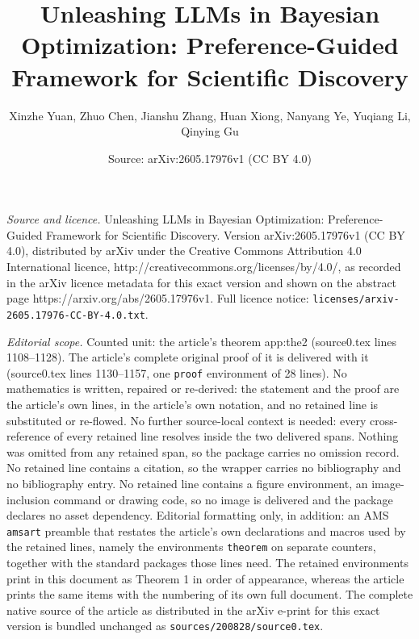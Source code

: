 \documentclass[10pt,a4paper]{amsart}
\title{Unleashing LLMs in Bayesian Optimization: Preference-Guided Framework for Scientific Discovery}
\author{Xinzhe Yuan, Zhuo Chen, Jianshu Zhang, Huan Xiong, Nanyang Ye, Yuqiang Li, Qinying Gu}
\date{Source: arXiv:2605.17976v1 (CC BY 4.0)}
\begin{document}
\maketitle

\noindent\emph{Source and licence.} Unleashing LLMs in Bayesian Optimization: Preference-Guided Framework for Scientific Discovery. Version arXiv:2605.17976v1 (CC BY 4.0), distributed by arXiv under the Creative Commons Attribution 4.0 International licence, http://creativecommons.org/licenses/by/4.0/, as recorded in the arXiv licence metadata for this exact version and shown on the abstract page https://arxiv.org/abs/2605.17976v1. Full licence notice: \texttt{licenses/arxiv-2605.17976-CC-BY-4.0.txt}.\par\smallskip

\noindent\textit{Editorial scope.} Counted unit: the article's theorem app:the2 (source0.tex lines 1108--1128). The article's complete original proof of it is delivered with it (source0.tex lines 1130--1157, one \texttt{proof} environment of 28 lines). No mathematics is written, repaired or re-derived: the statement and the proof are the article's own lines, in the article's own notation, and no retained line is substituted or re-flowed.  No further source-local context is needed: every cross-reference of every retained line resolves inside the two delivered spans.  Nothing was omitted from any retained span, so the package carries no omission record.  No retained line contains a citation, so the wrapper carries no bibliography and no bibliography entry.  No retained line contains a figure environment, an image-inclusion command or drawing code, so no image is delivered and the package declares no asset dependency.  Editorial formatting only, in addition: an AMS \texttt{amsart} preamble that restates the article's own declarations and macros used by the retained lines, namely the environments \texttt{theorem} on separate counters, together with the standard packages those lines need.  The retained environments print in this document as Theorem 1 in order of appearance, whereas the article prints the same items with the numbering of its own full document.  The complete native source of the article as distributed in the arXiv e-print for this exact version is bundled unchanged as \texttt{sources/200828/source0.tex}.
\end{document}
